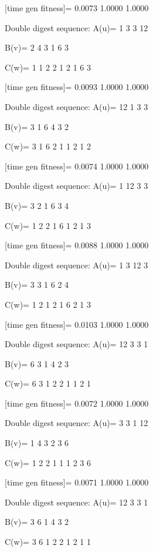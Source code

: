 [time gen fitness]=
    0.0073    1.0000    1.0000

Double digest sequence:
A(u)=
     1     3     3    12

B(v)=
     2     4     3     1     6     3

C(w)=
     1     1     2     2     1     2     1     6     3

[time gen fitness]=
    0.0093    1.0000    1.0000

Double digest sequence:
A(u)=
    12     1     3     3

B(v)=
     3     1     6     4     3     2

C(w)=
     3     1     6     2     1     1     2     1     2

[time gen fitness]=
    0.0074    1.0000    1.0000

Double digest sequence:
A(u)=
     1    12     3     3

B(v)=
     3     2     1     6     3     4

C(w)=
     1     2     2     1     6     1     2     1     3

[time gen fitness]=
    0.0088    1.0000    1.0000

Double digest sequence:
A(u)=
     1     3    12     3

B(v)=
     3     3     1     6     2     4

C(w)=
     1     2     1     2     1     6     2     1     3

[time gen fitness]=
    0.0103    1.0000    1.0000

Double digest sequence:
A(u)=
    12     3     3     1

B(v)=
     6     3     1     4     2     3

C(w)=
     6     3     1     2     2     1     1     2     1

[time gen fitness]=
    0.0072    1.0000    1.0000

Double digest sequence:
A(u)=
     3     3     1    12

B(v)=
     1     4     3     2     3     6

C(w)=
     1     2     2     1     1     1     2     3     6

[time gen fitness]=
    0.0071    1.0000    1.0000

Double digest sequence:
A(u)=
    12     3     3     1

B(v)=
     3     6     1     4     3     2

C(w)=
     3     6     1     2     2     1     2     1     1

